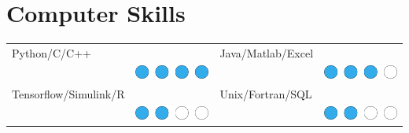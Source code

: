 \documentclass[a4paper,10pt]{article}
\begin{document}
\begin{minipage}[H]{0.6\textwidth}%

\section{Computer Skills}
\begin{tabular}{ l l l l }
Python/\textsc{C/C++} & &  Java/Matlab/Excel \\
& \includegraphics[scale=0.1]{icons/balls_proficient.pdf} & & \includegraphics[scale=0.1]{icons/balls_advanced.pdf} \\
Tensorflow/Simulink/R & & Unix/Fortran/\textsc{SQL} \\
& \includegraphics[scale=0.1]{icons/balls_mid.pdf} & & \includegraphics[scale=0.1]{icons/balls_mid.pdf}
\end{tabular}

\end{minipage}%
\hspace{1em}
\end{document}
